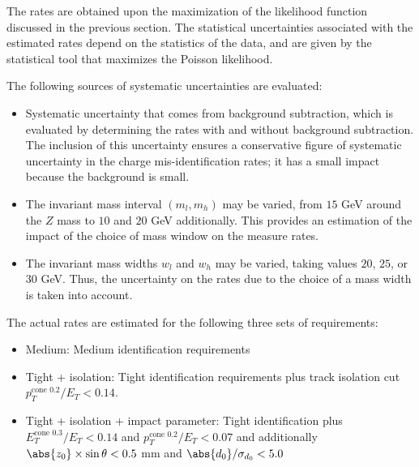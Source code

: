 The rates are obtained upon the maximization of the likelihood function
discussed in the previous section. The statistical uncertainties associated
with the estimated rates depend on the statistics of the data, and are given by
the statistical tool that maximizes the Poisson likelihood.

\vspace{3mm}

The following sources of systematic uncertainties are evaluated:

\begin{itemize}


	\item Systematic uncertainty that comes from background subtraction, which is
	      evaluated by determining the rates with and without background subtraction. The
	      inclusion of this uncertainty ensures a conservative figure of systematic
	      uncertainty in the charge mis-identification rates; it has a small impact
	      because the background is small.


\item The invariant mass interval $(m_l,m_h)$ may be varied, from $15$ GeV
around the $Z$ mass to $10$ and $20$ GeV additionally. This provides an
estimation of the impact of the choice of mass window on the measure rates.


	\item The invariant mass widths $w_l$ and $w_h$ may be varied, taking values
	      $20$, $25$, or $30$ GeV. Thus, the uncertainty on the rates
	      due to the choice of a mass width is taken into account. 

\end{itemize}

The actual rates are estimated for the following three sets of requirements:

\begin{itemize}
	\item Medium: Medium identification requirements

	\item Tight + isolation: Tight identification requirements plus track isolation
	      cut $p_T^{\text{cone 0.2}} / E_T < 0.14$.

	\item Tight + isolation + impact parameter: Tight identification plus
	      $E_T^{\text{cone 0.3}} / E_T < 0.14$ and $p_T^{\text{cone 0.2}} / E_T < 0.07$
	      and additionally $\abs{z_0}\times \sin\theta < 0.5$ mm and
	      $\abs{d_0}/\sigma_{d_0} < 5.0$


\end{itemize}

